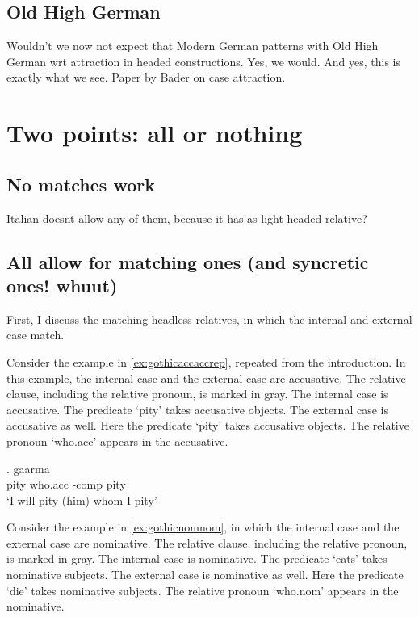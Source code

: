 \subsection{Old High German}

Wouldn't we now not expect that Modern German patterns with Old High German wrt attraction in headed constructions. Yes, we would. And yes, this is exactly what we see. Paper by Bader on case attraction.



\section{Two points: all or nothing}

\subsection{No matches work}

Italian doesnt allow any of them, because it has  as light headed relative?


\subsection{All allow for matching ones (and syncretic ones! whuut)}

First, I discuss the matching headless relatives, in which the internal and external case match.

Consider the example in \ref{ex:gothicaccaccrep}, repeated from the introduction. In this example, the internal case and the external case are accusative.
The relative clause, including the relative pronoun, is marked in gray.
The internal case is accusative. The predicate  `pity' takes accusative objects.
The external case is accusative as well. Here the predicate  `pity' takes accusative objects.
The relative pronoun  `who.\ac{acc}' appears in the accusative.

\exg. gaarma   \\
 pity\scsub{[acc]} who.\ac{acc} -\ac{comp} pity\scsub{[acc]}\\
 `I will pity (him) whom I pity' \label{ex:gothicaccaccrep}

Consider the example in \ref{ex:gothicnomnom}, in which the internal case and the external case are nominative.
The relative clause, including the relative pronoun, is marked in gray.
The internal case is nominative. The predicate  `eats' takes nominative subjects.
The external case is nominative as well. Here the predicate  `die' takes nominative subjects.
The relative pronoun  `who.\ac{nom}' appears in the nominative.

